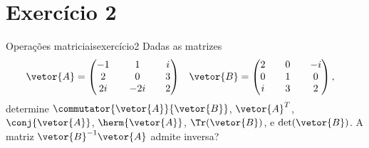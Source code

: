 \section*{Exercício 2}
\begin{exercício}{Operações matriciais}{exercício2}
    Dadas as matrizes
    \begin{align*}
        \vetor{A} &= \begin{pmatrix}
            -1 && 1 && i\\
            2 && 0 && 3\\
            2i &&-2i&& 2
        \end{pmatrix}&
        \vetor{B} &= \begin{pmatrix}
            2 && 0 &&-i\\
            0 && 1 && 0\\
            i && 3 && 2
        \end{pmatrix},
    \end{align*}
    determine \(\commutator{\vetor{A}}{\vetor{B}}\), \(\vetor{A}^T\), \(\conj{\vetor{A}}\), \(\herm{\vetor{A}}\), \(\Tr(\vetor{B})\), e \(\det(\vetor{B})\). A matriz \(\vetor{B}^{-1}\vetor{A}\) admite inversa?
\end{exercício}
